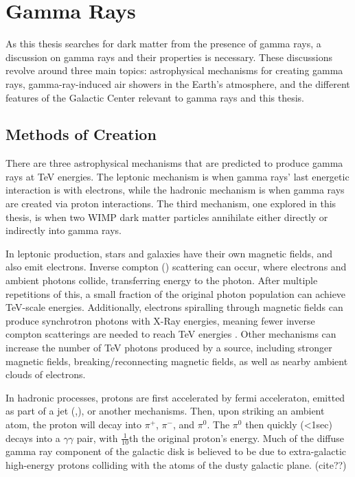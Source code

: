 \cleartooddpage[\thispagestyle{empty}]
\chapter{Gamma Rays}

As this thesis searches for dark matter from the presence of gamma rays, a discussion on gamma rays and their properties is necessary.
These discussions revolve around three main topics: astrophysical mechanisms for creating gamma rays, gamma-ray-induced air showers in the Earth's atmosphere, and the different features of the Galactic Center relevant to gamma rays and this thesis.


\section{Methods of Creation}

There are three astrophysical mechanisms that are predicted to produce gamma rays at TeV energies.
The leptonic mechanism is when gamma rays' last energetic interaction is with electrons, while the hadronic mechanism is when gamma rays are created via proton interactions.
The third mechanism, one explored in this thesis, is when two WIMP dark matter particles annihilate either directly or indirectly into gamma rays.

In leptonic production, stars and galaxies have their own magnetic fields, and also emit electrons.
Inverse compton (\cite{compton_effect}) scattering can occur, where electrons and ambient photons collide, transferring energy to the photon.
After multiple repetitions of this, a small fraction of the original photon population can achieve TeV-scale energies.
Additionally, electrons spiralling through magnetic fields can produce synchrotron photons with X-Ray energies, meaning fewer inverse compton scatterings are needed to reach TeV energies \cite{self_compton}.
Other mechanisms can increase the number of TeV photons produced by a source, including stronger magnetic fields, breaking/reconnecting magnetic fields, as well as nearby ambient clouds of electrons.

In hadronic processes, protons are first accelerated by fermi acceleraton, emitted as part of a jet (\cite{hadronic1},\cite{hadronic2}), or another mechanisms.
Then, upon striking an ambient atom, the proton will decay into $\pi^{+}$, $\pi^{-}$, and $\pi^{0}$.
The $\pi^{0}$ then quickly (<1sec) decays into a $\gamma\gamma$ pair, with \nicetilde $\frac{1}{10}$th the original proton's energy.
Much of the diffuse gamma ray component of the galactic disk is believed to be due to extra-galactic high-energy protons colliding with the atoms of the dusty galactic plane. {\color{red}(cite??)}


